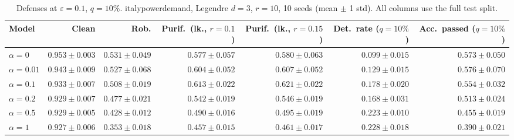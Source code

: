 \begin{table}[htbp]
  \centering
  \small
  \begin{tabular}{@{}lrrrrrr@{}}
    \toprule
    Model & Clean & Rob. & Purif.\ (lk., $r{=}0.1$) & Purif.\ (lk., $r{=}0.15$) & Det.\ rate ($q{=}10\%$) & Acc.\ passed ($q{=}10\%$) \\
    \midrule
    $\alpha{=}0$ & $\mathbf{0.953 \pm 0.003}$ & $\mathbf{0.531 \pm 0.049}$ & $0.577 \pm 0.057$ & $0.580 \pm 0.063$ & $0.099 \pm 0.015$ & $0.573 \pm 0.050$ \\
    $\alpha{=}0.01$ & $0.943 \pm 0.009$ & $0.527 \pm 0.068$ & $0.604 \pm 0.052$ & $0.607 \pm 0.052$ & $0.129 \pm 0.015$ & $\mathbf{0.576 \pm 0.070}$ \\
    $\alpha{=}0.1$ & $0.933 \pm 0.007$ & $0.508 \pm 0.019$ & $\mathbf{0.613 \pm 0.022}$ & $\mathbf{0.621 \pm 0.022}$ & $0.178 \pm 0.020$ & $0.554 \pm 0.032$ \\
    $\alpha{=}0.2$ & $0.929 \pm 0.007$ & $0.477 \pm 0.021$ & $0.542 \pm 0.019$ & $0.546 \pm 0.019$ & $0.168 \pm 0.031$ & $0.513 \pm 0.024$ \\
    $\alpha{=}0.5$ & $0.929 \pm 0.005$ & $0.428 \pm 0.012$ & $0.490 \pm 0.016$ & $0.495 \pm 0.019$ & $0.223 \pm 0.010$ & $0.455 \pm 0.019$ \\
    $\alpha{=}1$ & $0.927 \pm 0.006$ & $0.353 \pm 0.018$ & $0.457 \pm 0.015$ & $0.461 \pm 0.017$ & $\mathbf{0.228 \pm 0.018}$ & $0.390 \pm 0.021$ \\
    \bottomrule
  \end{tabular}
  \caption{Defenses at $\varepsilon=0.1$, $q{=}10\%$. italypowerdemand, Legendre $d{=}3$, $r{=}10$, 10 seeds (mean $\pm$ 1 std). All columns use the full test split.}
  \label{tab:italypowerdemand_models_r10_eps0.1}
\end{table}
